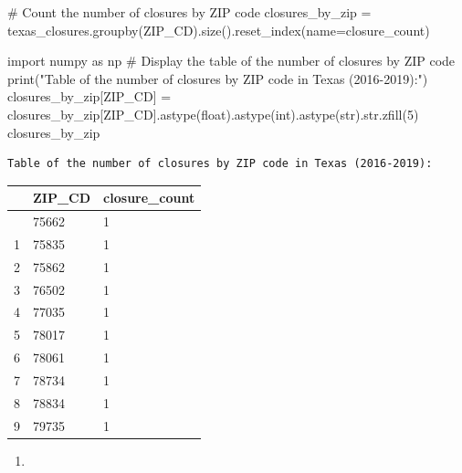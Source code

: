 \documentclass[
  letterpaper,
  DIV=11,
  numbers=noendperiod]{scrartcl}
\newenvironment{Shaded}{\begin{snugshade}}{\end{snugshade}}
\newcommand{\BuiltInTok}[1]{\textcolor[rgb]{0.00,0.23,0.31}{#1}}
\newcommand{\CommentTok}[1]{\textcolor[rgb]{0.37,0.37,0.37}{#1}}
\newcommand{\DecValTok}[1]{\textcolor[rgb]{0.68,0.00,0.00}{#1}}
\newcommand{\ImportTok}[1]{\textcolor[rgb]{0.00,0.46,0.62}{#1}}
\newcommand{\NormalTok}[1]{\textcolor[rgb]{0.00,0.23,0.31}{#1}}
\newcommand{\OperatorTok}[1]{\textcolor[rgb]{0.37,0.37,0.37}{#1}}
\newcommand{\StringTok}[1]{\textcolor[rgb]{0.13,0.47,0.30}{#1}}
\providecommand{\tightlist}{%
  \setlength{\itemsep}{0pt}\setlength{\parskip}{0pt}}\usepackage{longtable,booktabs,array}
\begin{document}
\begin{Shaded}
\begin{Highlighting}[]
\CommentTok{\# Count the number of closures by ZIP code}
\NormalTok{closures\_by\_zip }\OperatorTok{=}\NormalTok{ texas\_closures.groupby(}\StringTok{\textquotesingle{}ZIP\_CD\textquotesingle{}}\NormalTok{).size().reset\_index(name}\OperatorTok{=}\StringTok{\textquotesingle{}closure\_count\textquotesingle{}}\NormalTok{)}

\ImportTok{import}\NormalTok{ numpy }\ImportTok{as}\NormalTok{ np}
\CommentTok{\# Display the table of the number of closures by ZIP code}
\BuiltInTok{print}\NormalTok{(}\StringTok{"Table of the number of closures by ZIP code in Texas (2016{-}2019):"}\NormalTok{)}
\NormalTok{closures\_by\_zip[}\StringTok{\textquotesingle{}ZIP\_CD\textquotesingle{}}\NormalTok{] }\OperatorTok{=}\NormalTok{ closures\_by\_zip[}\StringTok{\textquotesingle{}ZIP\_CD\textquotesingle{}}\NormalTok{].astype(}\BuiltInTok{float}\NormalTok{).astype(}\BuiltInTok{int}\NormalTok{).astype(}\BuiltInTok{str}\NormalTok{).}\BuiltInTok{str}\NormalTok{.zfill(}\DecValTok{5}\NormalTok{)}
\NormalTok{closures\_by\_zip}
\end{Highlighting}
\end{Shaded}

\begin{verbatim}
Table of the number of closures by ZIP code in Texas (2016-2019):
\end{verbatim}

\begin{longtable}[]{@{}lll@{}}
\toprule\noalign{}
& ZIP\_CD & closure\_count \\
\midrule\noalign{}
\endhead
\bottomrule\noalign{}
\endlastfoot
0 & 75662 & 1 \\
1 & 75835 & 1 \\
2 & 75862 & 1 \\
3 & 76502 & 1 \\
4 & 77035 & 1 \\
5 & 78017 & 1 \\
6 & 78061 & 1 \\
7 & 78734 & 1 \\
8 & 78834 & 1 \\
9 & 79735 & 1 \\
\end{longtable}

\begin{enumerate}
\def\labelenumi{\arabic{enumi}.}
\setcounter{enumi}{1}
\tightlist
\item
\end{enumerate}
\end{document}
